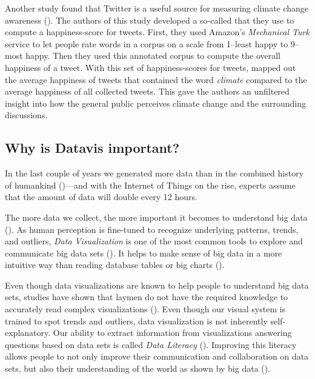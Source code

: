 Another study found that Twitter is a useful source for measuring climate change awareness (\cite{cody2015}). The authors of this study developed a so-called  that they use to compute a happiness-score for tweets. First, they used Amazon's \emph{Mechanical Turk} service to let people rate words in a corpus on a scale from 1--least happy to 9--most happy. Then they used this annotated corpus to compute the overall happiness of a tweet. With this set of happiness-scores for tweets, \citeauthor{cody2015} mapped out the average happiness of tweets that contained the word \emph{climate} compared to the average happiness of all collected tweets. This gave the authors an unfiltered insight into how the general public perceives climate change and the surrounding discussions.


\subsection{Why is Datavis important?}


In the last couple of years we generated more data than in the combined history of humankind (\cite{helbing2019will})---and with the Internet of Things on the rise, experts assume that the amount of data will double every 12 hours.

The more data we collect, %
the more important it becomes to understand big data (\cite{borner2019}). As human perception is fine-tuned to recognize underlying patterns, trends, and outliers, \emph{Data Visualization} is one of the most common tools to explore and communicate big data sets (\cite{heer2010}). It helps to make sense of big data in a more intuitive way than reading database tables or big charts (\cite{donalek2014}).

Even though data visualizations are known to help people to understand big data sets, studies have shown that laymen do not have the required knowledge to accurately read complex visualizations (\cite{borner2016}). %
Even though our visual system is trained to spot trends and outliers, data visualization is not inherently self-explanatory. Our ability to extract information from visualizations answering questions based on data sets is called \emph{Data Literacy} (\cite{boy2014}). Improving this literacy allows people to not only improve their communication and collaboration on data sets, but also their understanding of the world as shown by big data (\cite{borner2019}). 
